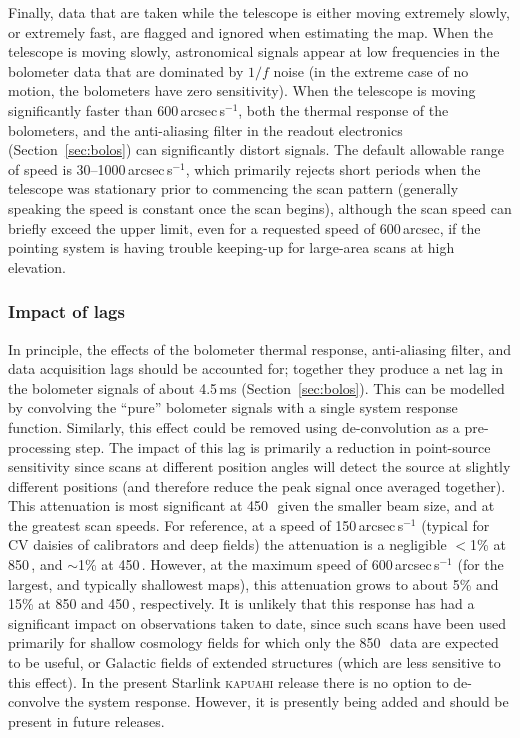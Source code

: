 \documentclass[useAMS,usenatbib,nofootinbib]{mn2e}
\begin{document}
Finally, data that are taken while the telescope is either moving
extremely slowly, or extremely fast, are flagged and ignored when
estimating the map. When the telescope is moving slowly, astronomical
signals appear at low frequencies in the bolometer data that are
dominated by $1/f$ noise (in the extreme case of no motion, the
bolometers have zero sensitivity). When the telescope is moving
significantly faster than 600\,arcsec\,s$^{-1}$, both the thermal
response of the bolometers, and the anti-aliasing filter in the
readout electronics (Section~\ref{sec:bolos}) can significantly
distort signals.  The default allowable range of speed is
30--1000\,arcsec\,s$^{-1}$, which primarily rejects short periods when
the telescope was stationary prior to commencing the scan pattern
(generally speaking the speed is constant once the scan begins),
although the scan speed can briefly exceed the upper limit, even for a
requested speed of 600\,arcsec, if the pointing system is having
trouble keeping-up for large-area scans at high elevation.


\subsubsection{Impact of lags}
\label{sec:lags}

In principle, the effects of the bolometer thermal response,
anti-aliasing filter, and data acquisition lags should be accounted
for; together they produce a net lag in the bolometer signals of about
4.5\,ms (Section~\ref{sec:bolos}). This can be modelled by convolving
the ``pure'' bolometer signals with a single system response
function. Similarly, this effect could be removed using de-convolution
as a pre-processing step. The impact of this lag is primarily a
reduction in point-source sensitivity since scans at different
position angles will detect the source at slightly different positions
(and therefore reduce the peak signal once averaged together). This
attenuation is most significant at 450\,\micron\ given the smaller
beam size, and at the greatest scan speeds. For reference, at a speed
of 150\,arcsec\,s$^{-1}$ (typical for CV daisies of calibrators and
deep fields) the attenuation is a negligible $<$1\% at 850\,\micron,
and $\sim$1\% at 450\,\micron. However, at the maximum speed of
600\,arcsec\,s$^{-1}$ (for the largest, and typically shallowest
maps), this attenuation grows to about 5\% and 15\% at 850 and
450\,\micron, respectively. It is unlikely that this response has had
a significant impact on observations taken to date, since such scans
have been used primarily for shallow cosmology fields for which only
the 850\,\micron\ data are expected to be useful, or Galactic fields
of extended structures (which are less sensitive to this effect). In
the present Starlink \textsc{kapuahi} release there is no option to
de-convolve the system response. However, it is presently being added
and should be present in future releases.
\end{document}
